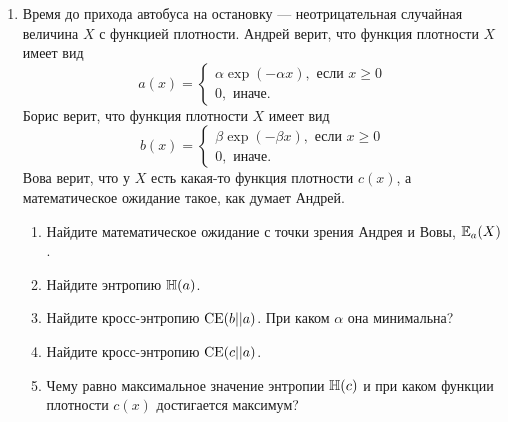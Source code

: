 \begin{enumerate}
\item Время до прихода автобуса на остановку — неотрицательная случайная величина $X$ с функцией плотности. 
Андрей верит, что функция плотности $X$ имеет вид 
\[
a(x) = \begin{cases}
    \alpha \exp(-\alpha x), \text{ если } x \geq 0\\
    0, \text{ иначе}.
\end{cases}
\]
Борис верит, что функция плотности $X$ имеет вид 
\[
b(x) = \begin{cases}
    \beta \exp(-\beta x), \text{ если } x \geq 0\\
    0, \text{ иначе}.
\end{cases}
\]
Вова верит, что у $X$ есть какая-то функция плотности $c(x)$, а математическое ожидание такое, как думает Андрей. 
\begin{enumerate}
    \item Найдите математическое ожидание с точки зрения Андрея и Вовы, $\operatorname{\mathbb{E}}_a(X)$.
    \item Найдите энтропию $\operatorname{\mathbb{H}}(a)$. 
    \item Найдите кросс-энтропию $\operatorname{\mathrm{CE}}(b || a)$. При каком $\alpha$ она минимальна?
    \item Найдите кросс-энтропию $\operatorname{\mathrm{CE}}(c|| a)$.
    \item Чему равно максимальное значение энтропии $\operatorname{\mathbb{H}}(c)$ и при каком функции плотности $c(x)$ достигается максимум?
\end{enumerate}





\end{enumerate}
